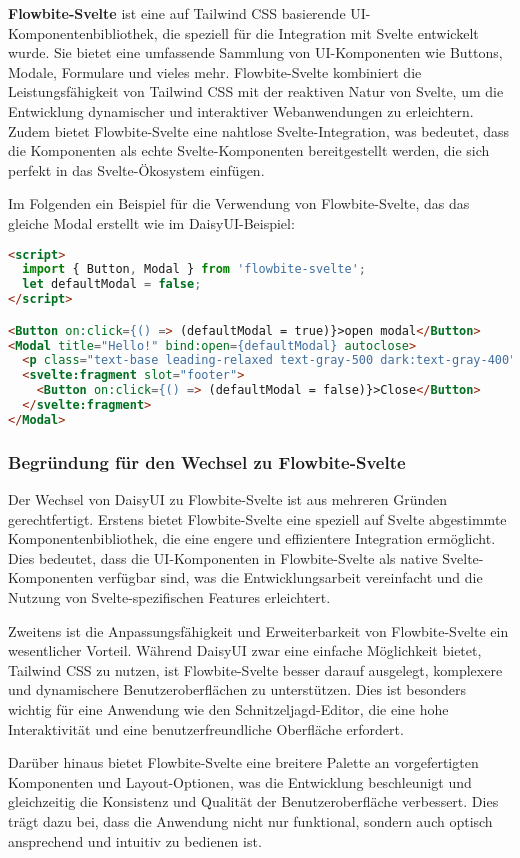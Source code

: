 \textbf{Flowbite-Svelte} ist eine auf Tailwind CSS basierende UI-Komponentenbibliothek, die speziell für die Integration mit Svelte entwickelt wurde. Sie bietet eine umfassende Sammlung von UI-Komponenten wie Buttons, Modale, Formulare und vieles mehr. Flowbite-Svelte kombiniert die Leistungsfähigkeit von Tailwind CSS mit der reaktiven Natur von Svelte, um die Entwicklung dynamischer und interaktiver Webanwendungen zu erleichtern. Zudem bietet Flowbite-Svelte eine nahtlose Svelte-Integration, was bedeutet, dass die Komponenten als echte Svelte-Komponenten bereitgestellt werden, die sich perfekt in das Svelte-Ökosystem einfügen. 

Im Folgenden ein Beispiel für die Verwendung von Flowbite-Svelte, das das gleiche Modal erstellt wie im DaisyUI-Beispiel:

\begin{lstlisting}[language=html, caption={Code Ausschnitt Flowbite-Svelte Beispiel}]
<script>
  import { Button, Modal } from 'flowbite-svelte';
  let defaultModal = false;
</script>

<Button on:click={() => (defaultModal = true)}>open modal</Button>
<Modal title="Hello!" bind:open={defaultModal} autoclose>
  <p class="text-base leading-relaxed text-gray-500 dark:text-gray-400">Press ESC key or click the button below to close</p>
  <svelte:fragment slot="footer">
    <Button on:click={() => (defaultModal = false)}>Close</Button>
  </svelte:fragment>
</Modal>
\end{lstlisting}

\subsubsection{Begründung für den Wechsel zu Flowbite-Svelte}

Der Wechsel von DaisyUI zu Flowbite-Svelte ist aus mehreren Gründen gerechtfertigt. Erstens bietet Flowbite-Svelte eine speziell auf Svelte abgestimmte Komponentenbibliothek, die eine engere und effizientere Integration ermöglicht. Dies bedeutet, dass die UI-Komponenten in Flowbite-Svelte als native Svelte-Komponenten verfügbar sind, was die Entwicklungsarbeit vereinfacht und die Nutzung von Svelte-spezifischen Features erleichtert.

Zweitens ist die Anpassungsfähigkeit und Erweiterbarkeit von Flowbite-Svelte ein wesentlicher Vorteil. Während DaisyUI zwar eine einfache Möglichkeit bietet, Tailwind CSS zu nutzen, ist Flowbite-Svelte besser darauf ausgelegt, komplexere und dynamischere Benutzeroberflächen zu unterstützen. Dies ist besonders wichtig für eine Anwendung wie den Schnitzeljagd-Editor, die eine hohe Interaktivität und eine benutzerfreundliche Oberfläche erfordert.

Darüber hinaus bietet Flowbite-Svelte eine breitere Palette an vorgefertigten Komponenten und Layout-Optionen, was die Entwicklung beschleunigt und gleichzeitig die Konsistenz und Qualität der Benutzeroberfläche verbessert. Dies trägt dazu bei, dass die Anwendung nicht nur funktional, sondern auch optisch ansprechend und intuitiv zu bedienen ist.